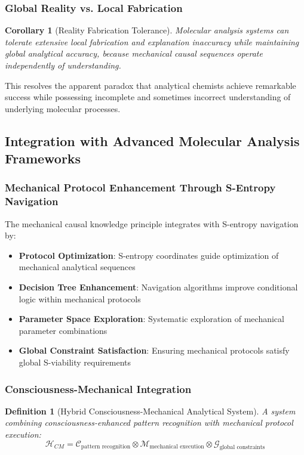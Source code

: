 \documentclass[11pt,a4paper]{article}
\newtheorem{corollary}[theorem]{Corollary}
\newtheorem{definition}[theorem]{Definition}
\theoremstyle{remark}
\begin{document}
\subsubsection{Global Reality vs. Local Fabrication}

\begin{corollary}[Reality Fabrication Tolerance]
Molecular analysis systems can tolerate extensive local fabrication and explanation inaccuracy while maintaining global analytical accuracy, because mechanical causal sequences operate independently of understanding.
\end{corollary}

This resolves the apparent paradox that analytical chemists achieve remarkable success while possessing incomplete and sometimes incorrect understanding of underlying molecular processes.

\subsection{Integration with Advanced Molecular Analysis Frameworks}

\subsubsection{Mechanical Protocol Enhancement Through S-Entropy Navigation}

The mechanical causal knowledge principle integrates with S-entropy navigation by:

\begin{itemize}
\item \textbf{Protocol Optimization}: S-entropy coordinates guide optimization of mechanical analytical sequences
\item \textbf{Decision Tree Enhancement}: Navigation algorithms improve conditional logic within mechanical protocols
\item \textbf{Parameter Space Exploration}: Systematic exploration of mechanical parameter combinations
\item \textbf{Global Constraint Satisfaction}: Ensuring mechanical protocols satisfy global S-viability requirements
\end{itemize}

\subsubsection{Consciousness-Mechanical Integration}

\begin{definition}[Hybrid Consciousness-Mechanical Analytical System]
A system combining consciousness-enhanced pattern recognition with mechanical protocol execution:
$$\mathcal{H}_{CM} = \mathcal{C}_{\text{pattern recognition}} \otimes \mathcal{M}_{\text{mechanical execution}} \otimes \mathcal{G}_{\text{global constraints}}$$
\end{definition}
\end{document}
